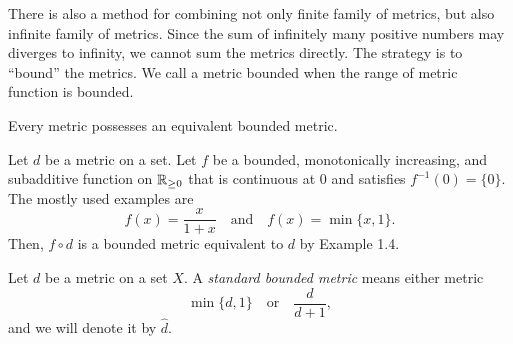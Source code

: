 \documentclass{../note}
\begin{document}
There is also a method for combining not only finite family of metrics, but also infinite family of metrics.
Since the sum of infinitely many positive numbers may diverges to infinity, we cannot sum the metrics directly.
The strategy is to ``bound'' the metrics.
We call a metric bounded when the range of metric function is bounded.

\begin{prop}
Every metric possesses an equivalent bounded metric.
\end{prop}
\begin{pf}
Let $d$ be a metric on a set.
Let $f$ be a bounded, monotonically increasing, and subadditive function on $\mathbb{R}_{\ge0}$ that is continuous at 0 and satisfies $f^{-1}(0)=\{0\}$.
The mostly used examples are
\[f(x)=\frac x{1+x}\quad\text{and}\quad f(x)=\min\{x,1\}.\]
Then, $f\circ d$ is a bounded metric equivalent to $d$ by Example 1.4.
\end{pf}

\begin{defn}
Let $d$ be a metric on a set $X$.
A \emph{standard bounded metric} means either metric
\[\min\{d,1\}\quad\text{or}\quad\frac d{d+1},\]
and we will denote it by $\hat d$.
\end{defn}
\end{document}
